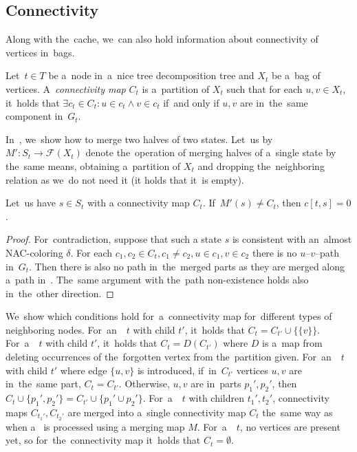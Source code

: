 \subsection{Connectivity}

Along with the~cache, we~can also hold information about connectivity of
vertices in~bags.
%
\begin{definition}
	Let~\( t \in T \) be a~node in~a~nice tree decomposition tree and
	\( X_t \) be a~bag of vertices.
	A~\emph{connectivity map} \( C_t \) is a~partition of \( X_t \) such that
	for each \( u, v \in X_t \), it~holds that
	\( {\exists c_t \in C_t} : {u \in c_t \land v \in c_t} \) if~and only if
	\( u, v \) are in~the~same component in~\( G_t \).
\end{definition}
%

In~, we~show how to merge
two halves of two states. Let~us by \( M': S_t \to \mathcal{F}(X_t) \) denote
the~operation of merging halves of a~single state by the~same means,
obtaining a~partition of \( X_t \) and dropping
the~neighboring relation as we~do not need it
(it holds that it~is empty).
%
\begin{lemma}
	Let~us have \( s \in S_t \) with a connectivity map \( C_t \).
	If~\( M'(s) \ne C_t \), then \( c[t, s] = 0 \).
\end{lemma}
%
\begin{proof}
	For~contradiction, suppose that such a state \( s \)
	is consistent with an~almost NAC-coloring \( \delta \).
	For each \( c_1, c_2 \in C_t, c_1 \ne c_2, u \in c_1, v \in c_2 \)
	there is no \( u \)--\( v \)--path in~\( G_t \).
	Then there is also no path in~the~merged parts as
	they are merged along a~path in~.
	The~same argument with the~path non-existence
	holds also in~the~other direction.
\end{proof}
%
We~show which conditions hold for~a~connectivity map
for~different types of neighboring nodes.
%
For~an~\IntroduceVertexNode{}~\( t \) with child \( t' \), it~holds that
\( C_t = C_{t'} \cup \{\{ v \}\} \).
%
For~a~\ForgetVertexNode{}~\( t \) with child \( t' \), it~holds that
\( C_t = D(C_{t'}) \)
where \( D \) is a~map from 
deleting occurrences of the~forgotten vertex from the~partition given.
%
For~an~\IntroduceEdgeNode{}~\( t \) with child \( t' \)
where edge \( \{u, v\} \) is introduced,
if~in~\( C_{t'} \) vertices \( u, v \) are in~the~same part, \( C_t = C_{t'} \).
Otherwise, \( u, v \) are in~parts \( p_1', p_2' \), then
\( C_t \cup \{p_1', p_2'\} = C_{t'} \cup \{ p_1' \cup p_2'\} \).
%
For~a~\JoinNode{}~\( t \) with children \( t_1', t_2' \),
connectivity maps \( C_{t_1'}, C_{t_2'} \) are merged into
a~single connectivity map \( C_t \)
the~same way as when a~\JoinNode{} is processed using a merging map \( M \).
%
For~a~\LeafNode{}~\( t \),
no vertices are present yet, so for~the~connectivity map it~holds that \( C_t = \emptyset \).


